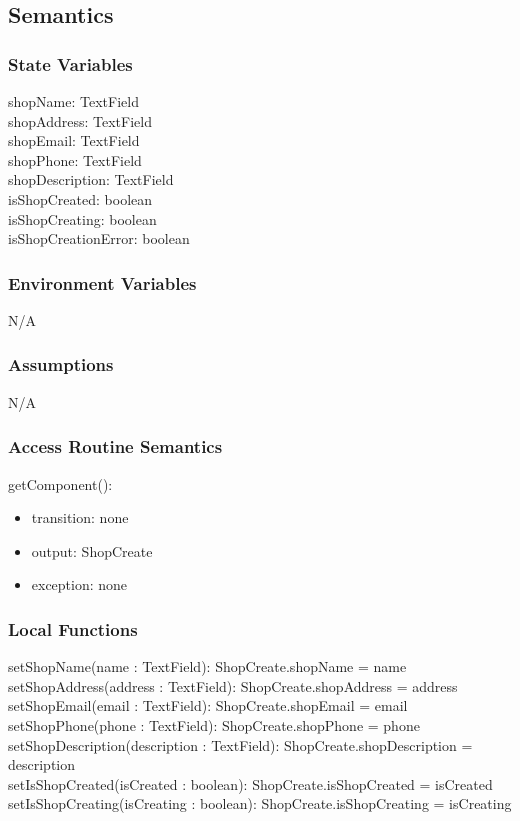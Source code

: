 \documentclass[12pt, titlepage]{article}
\begin{document}
\subsection{Semantics}

\subsubsection{State Variables}
 
shopName: TextField \\
shopAddress: TextField \\ 
shopEmail: TextField \\
shopPhone: TextField \\ 
shopDescription: TextField \\ 
isShopCreated: boolean \\ 
isShopCreating: boolean \\ 
isShopCreationError: boolean \\

\subsubsection{Environment Variables}

N/A

\subsubsection{Assumptions}

N/A

\subsubsection{Access Routine Semantics}

\noindent getComponent():
\begin{itemize}
    \item transition: none
    \item output: ShopCreate
    \item exception: none
\end{itemize}

\subsubsection{Local Functions}

setShopName(name : TextField): ShopCreate.shopName = name \\
setShopAddress(address : TextField): ShopCreate.shopAddress = address \\
setShopEmail(email : TextField): ShopCreate.shopEmail = email \\
setShopPhone(phone : TextField): ShopCreate.shopPhone = phone \\
setShopDescription(description : TextField): ShopCreate.shopDescription = description \\
setIsShopCreated(isCreated : boolean): ShopCreate.isShopCreated = isCreated \\
setIsShopCreating(isCreating : boolean): ShopCreate.isShopCreating = isCreating \\
\end{document}
